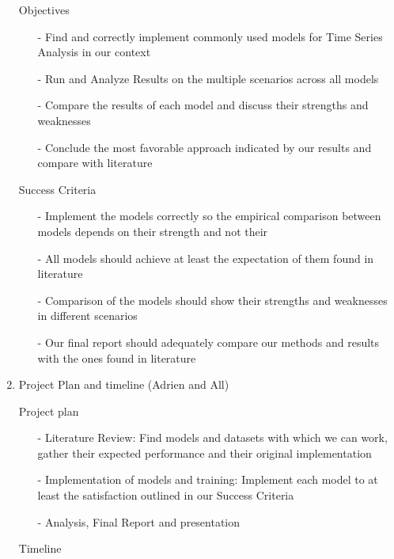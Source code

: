 \documentclass[10pt, letterpaper]{article}
\begin{document}
\begin{enumerate}
        Objectives
        \begin{itemize}
            \item[-] Find and correctly implement commonly used models for Time Series Analysis in our context
            \item[-] Run and Analyze Results on the multiple scenarios across all models
            \item[-] Compare the results of each model and discuss their strengths and weaknesses
            \item[-] Conclude the most favorable approach indicated by our results and compare with literature
        \end{itemize} 
        Success Criteria
        \begin{itemize}
            \item [-] Implement the models correctly so the empirical comparison between models depends on their strength and not their
            \item [-] All models should achieve at least the expectation of them found in literature
            \item [-] Comparison of the models should show their strengths and weaknesses in different scenarios
            \item [-] Our final report should adequately compare our methods and results with the ones found in literature
        \end{itemize}
        
    \item Project Plan and timeline (Adrien and All)
        
        Project plan
        \begin{itemize}
            \item [-] Literature Review: Find models and datasets with which we can work, gather their expected performance and their original implementation
            \item [-] Implementation of models and training: Implement each model to at least the satisfaction outlined in our Success Criteria
            \item [-] Analysis, Final Report and presentation
        \end{itemize}
    
        Timeline
        
\end{enumerate}
\end{document}

